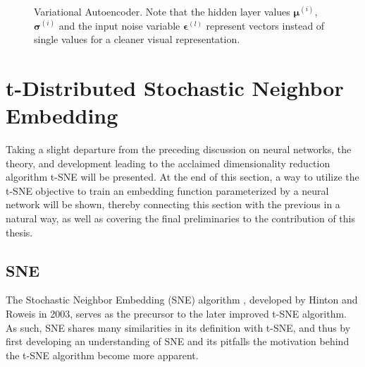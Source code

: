 

\begin{figure}[!htb]
  \centering
  \resizebox{0.8\textwidth}{!}{\unskip}
  \caption{Variational Autoencoder. Note that the hidden layer values $\mathbf{\mu}^{(i)}$, $\mathbf{\sigma}^{(i)}$ and the input noise variable $\mathbf{\epsilon}^{(l)}$ represent vectors instead of single values for a cleaner visual representation.}
  \label{fig:vae}
\end{figure}

\section{t-Distributed Stochastic Neighbor Embedding}
\label{section:tsne}

Taking a slight departure from the preceding discussion on neural networks, the theory, and development leading to the acclaimed dimensionality reduction algorithm t-SNE will be presented. At the end of this section, a way to utilize the t-SNE objective to train an embedding function parameterized by a neural network will be shown, thereby connecting this section with the previous in a natural way, as well as covering the final preliminaries to the contribution of this thesis.

\subsection{SNE}
\label{subsection:sne}

The Stochastic Neighbor Embedding (SNE) algorithm \cite{sne}, developed by Hinton and Roweis in 2003, serves as the precursor to the later improved t-SNE algorithm. As such, SNE shares many similarities in its definition with t-SNE, and thus by first developing an understanding of SNE and its pitfalls the motivation behind the t-SNE algorithm become more apparent.

